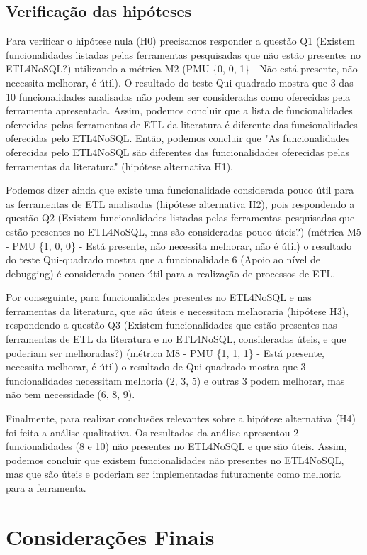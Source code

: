 \subsection{Verificação das hipóteses}

Para verificar o hipótese nula (H0) precisamos responder a questão Q1 (Existem funcionalidades listadas pelas ferramentas pesquisadas que não estão presentes no ETL4NoSQL?) utilizando a métrica M2 (PMU \{0, 0, 1\} - Não está presente, não necessita melhorar, é útil). O resultado do teste Qui-quadrado mostra que 3 das 10 funcionalidades analisadas não podem ser consideradas como oferecidas pela ferramenta apresentada. Assim, podemos concluir que a lista de funcionalidades oferecidas pelas ferramentas de ETL da literatura é diferente das funcionalidades oferecidas pelo ETL4NoSQL. Então, podemos concluir que "As funcionalidades oferecidas pelo ETL4NoSQL são diferentes das funcionalidades oferecidas pelas ferramentas da literatura" (hipótese alternativa H1).

Podemos dizer ainda que existe uma funcionalidade considerada pouco útil para as ferramentas de ETL analisadas (hipótese alternativa H2), pois respondendo a questão Q2 (Existem funcionalidades listadas pelas ferramentas pesquisadas que estão presentes no ETL4NoSQL, mas são consideradas pouco úteis?) (métrica M5 - PMU \{1, 0, 0\} - Está presente, não necessita melhorar, não é útil) o resultado do teste Qui-quadrado mostra que a funcionalidade 6 (Apoio ao nível de debugging) é considerada pouco útil para a realização de processos de ETL.

Por conseguinte, para funcionalidades presentes no ETL4NoSQL e nas ferramentas da literatura, que são úteis e necessitam melhoraria (hipótese H3), respondendo a questão Q3 (Existem funcionalidades que estão presentes nas ferramentas de ETL da literatura e no ETL4NoSQL, consideradas úteis, e que poderiam ser melhoradas?) (métrica M8 - PMU \{1, 1, 1\} - Está presente, necessita melhorar, é útil) o resultado de Qui-quadrado mostra que 3 funcionalidades necessitam melhoria (2, 3, 5) e outras 3 podem melhorar, mas não tem necessidade (6, 8, 9).

Finalmente, para realizar conclusões relevantes sobre a hipótese alternativa (H4) foi feita a análise qualitativa. Os resultados da análise apresentou 2 funcionalidades (8 e 10) não presentes no ETL4NoSQL e que são úteis. Assim, podemos concluir que existem funcionalidades não presentes no ETL4NoSQL, mas que são úteis e poderiam ser implementadas futuramente como melhoria para a ferramenta.
 



\section{Considerações Finais}



